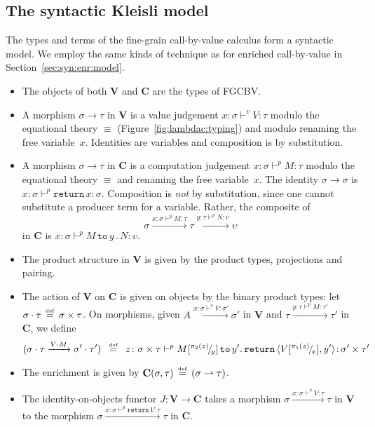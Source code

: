 \documentclass{LMCS}
\newcommand{\vj}[3]{#1 \mathrel{\vdash^{v}} #2 \colon \! #3}
\newcommand{\pj}[3]{#1 \mathrel{\vdash^p} #2 \colon \! #3}
\newcommand{\STA}{\sigma}
\newcommand{\STB}{\tau}
\newcommand{\STC}{\upsilon}
\newcommand{\slet}[3]{#2 \, \codefont{to} \, #1 \ld #3}
\newcommand{\return}[1]{\codefont{return} \, #1}
\newcommand{\pto}{\rightharpoonup}
\newcommand{\codefont}[1]{\mathtt{#1}}
\newcommand{\ld}{\mathpunct{.}}
\newcommand{\prj}[2]{\pi_{#1}(#2)}
\newcommand{\fst}[1]{\prj 1 {#1}}
\newcommand{\snd}[1]{\prj 2 {#1}}
\newcommand{\VCat}{\fixedcatfont{V}} \newcommand{\CCat}{\fixedcatfont{C}} \newcommand{\DCat}{\fixedcatfont{D}}
\newcommand{\ltensor}[2]{#1 \cdot #2}
\newcommand{\fixedcatfont}{\mathbf}
\newcommand{\pair}[2]{\langle #1 , #2 \rangle}
\newcommand{\defeq}{\mathrel{\,\stackrel{\mbox{\tiny{$\mathrm{def}$}}}=\,}}
\newcommand{\sub}[3]{#1[^{#2}\!/\!_{#3}]}
\begin{document}
\subsection{The syntactic Kleisli model}
\label{sec:syn:Kl:model}

The types and terms of the fine-grain call-by-value calculus form 
a syntactic model.
We employ the same kinds of technique as 
for enriched call-by-value in Section~\ref{sec:syn:enr:model}.
\begin{itemize}
\item The objects of both $\VCat$ and $\CCat$ are the types of FGCBV.
\item A morphism $\STA\to \STB$ in $\VCat$ is a value judgement
$\vj{x\colon \STA}{V}\STB$ modulo the equational theory $\equiv$
(Figure~\ref{fig:lambdac:typing}) and modulo renaming the free variable~$x$.
Identities are variables and composition is by substitution. 
\item 
A morphism $\STA\to \STB$ in $\CCat$ 
is a computation judgement $\pj{x\colon \STA}M \STB$ modulo the equational theory
$\equiv$ and renaming the free variable~$x$.
The identity $\STA\to \STA$ is $\pj{x\colon \STA} {\return x}\STA$.
Composition is \emph{not} by substitution,
since one cannot substitute a producer term for a variable.
Rather, the composite of 
\[
\STA\xrightarrow {\pj{x\colon \STA}{M}\STB} \STB
\xrightarrow {\pj{y\colon \STB} N \STC} \STC
\]
in $\CCat$ is 
$\pj{x\colon \STA}{\slet {y} M N} \STC$.
\item The product structure in $\VCat$ is given by the product
types, projections and pairing.
\item The action of $\VCat$ on $\CCat$ is given on objects 
by the binary product types: let $\ltensor \STA \STB\defeq \STA \times \STB$.
On morphisms, given $A\xrightarrow {\vj{x\colon \STA}V {\STA'}} {\STA'}$ 
in $\VCat$ 
and 
$\STB\xrightarrow {\pj{y\colon \STB}M{\STB'}}{\STB'}$
in $\CCat$,
we define 
\[(\ltensor \STA \STB\xrightarrow{\ltensor V M} \ltensor {\STA'} {\STB'} )
\ \defeq \ 
\pj {z\colon \STA\times \STB}
{\slet {y'} {\sub M {\snd z}y} {\return {\pair {\sub V{\fst z}x} {y'} }}}
{\STA'\times \STB'} \]
\item The enrichment is given by
$\CCat(\STA,\STB)\defeq (\STA\pto \STB)$.
\item The identity-on-objects functor
$J\colon \VCat\to \CCat$ takes a morphism
${\STA\xrightarrow {\vj{x\colon \STA} V \STB} \STB}$ 
in $\VCat$
to the morphism
${\STA\xrightarrow {\pj{x\colon \STA} {\return V} \STB} \STB}$ 
in $\CCat$.
\end{itemize}
\end{document}

